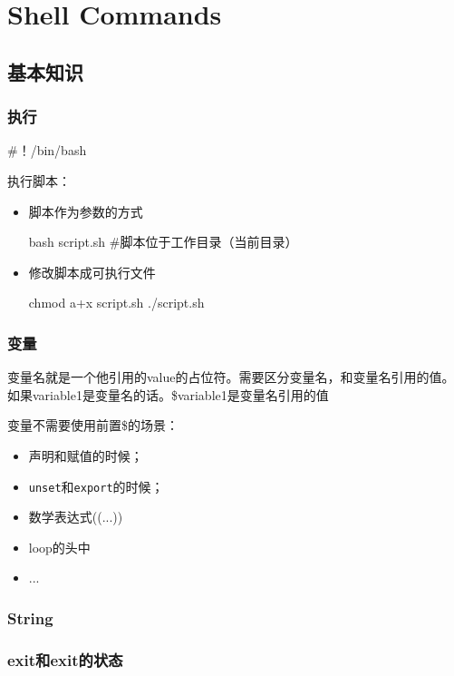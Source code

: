 \chapter{Shell Commands}

\section{基本知识}

\subsection{执行}

\begin{Bash}[开头告诉shell使用什么bash]
#！/bin/bash
\end{Bash}


执行脚本：

\begin{itemize}
\item 脚本作为参数的方式
\begin{Bash}
bash script.sh   #脚本位于工作目录（当前目录）
\end{Bash}

\item 修改脚本成可执行文件

\begin{Bash}[内核会读取首行来确定执行的bash]
chmod a+x script.sh
./script.sh
\end{Bash}

\end{itemize}

\subsection{变量}

变量名就是一个他引用的value的占位符。需要区分变量名，和变量名引用的值。如果variable1是变量名的话。\$variable1是变量名引用的值

变量不需要使用前置\$的场景：
\begin{itemize}
\item 声明和赋值的时候；
\item \lstinline$unset$和\lstinline$export$的时候；
\item 数学表达式((...))
\item loop的头中
\item ...
\end{itemize}

\subsection{String}

\subsection{exit和exit的状态}
